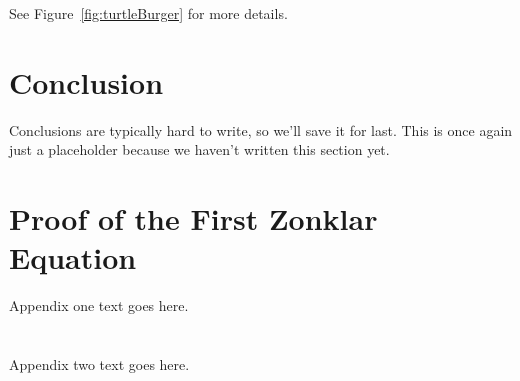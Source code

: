\documentclass[a4paper, 10pt, american, titlepage]{article}
\begin{document}
See Figure~\ref{fig:turtleBurger} for more details.

\section{Conclusion}
\label{sec:conclusion}

Conclusions are typically hard to write, so we'll save it for last. This is
once again just a placeholder because we haven't written this section yet.

\lipsum[1]

\clearpage %

\printbibliography
{}

\newpage

\appendices
\section{Proof of the First Zonklar Equation}
Appendix one text goes here.

\section{}
Appendix two text goes here.
\end{document}
